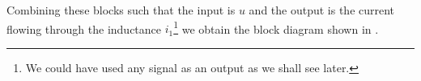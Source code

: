 Combining these blocks such that the input is $u$ and the output is
the current flowing through the inductance $i_1$\footnote{We could have used any signal as an output as we shall
  see later.} we obtain the block diagram shown in .
\begin{slide}\label{slide:l1s2}
\end{slide}

